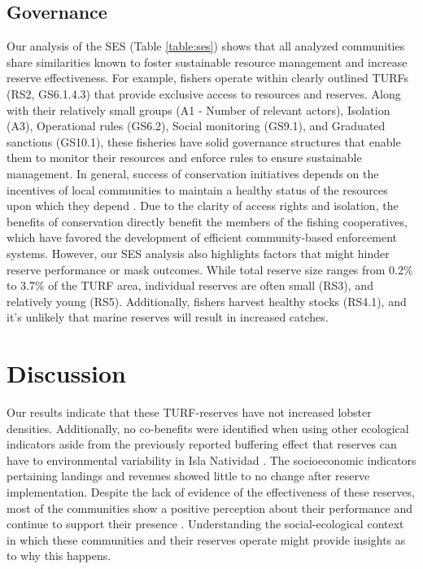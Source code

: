 \documentclass{frontiersSCNS}
\begin{document}
\hypertarget{governance}{%
\subsection{Governance}\label{governance}}

Our analysis of the SES (Table \ref{table:ses}) shows that all analyzed
communities share similarities known to foster sustainable resource
management and increase reserve effectiveness. For example, fishers
operate within clearly outlined TURFs (RS2, GS6.1.4.3) that provide
exclusive access to resources and reserves. Along with their relatively
small groups (A1 - Number of relevant actors), Isolation (A3),
Operational rules (GS6.2), Social monitoring (GS9.1), and Graduated
sanctions (GS10.1), these fisheries have solid governance structures
that enable them to monitor their resources and enforce rules to ensure
sustainable management. In general, success of conservation initiatives
depends on the incentives of local communities to maintain a healthy
status of the resources upon which they depend \citep{jupiter_2017}. Due
to the clarity of access rights and isolation, the benefits of
conservation directly benefit the members of the fishing cooperatives,
which have favored the development of efficient community-based
enforcement systems. However, our SES analysis also highlights factors
that might hinder reserve performance or mask outcomes. While total
reserve size ranges from 0.2\% to 3.7\% of the TURF area, individual
reserves are often small (RS3), and relatively young (RS5).
Additionally, fishers harvest healthy stocks (RS4.1), and it's unlikely
that marine reserves will result in increased catches.

\hypertarget{discussion}{%
\section{Discussion}\label{discussion}}

Our results indicate that these TURF-reserves have not increased lobster
densities. Additionally, no co-benefits were identified when using other
ecological indicators aside from the previously reported buffering
effect that reserves can have to environmental variability in Isla
Natividad \citep{micheli_2012-EU}. The socioeconomic indicators
pertaining landings and revenues showed little to no change after
reserve implementation. Despite the lack of evidence of the
effectiveness of these reserves, most of the communities show a positive
perception about their performance and continue to support their
presence \citep{ayer_2018}. Understanding the social-ecological context
in which these communities and their reserves operate might provide
insights as to why this happens.
\end{document}
